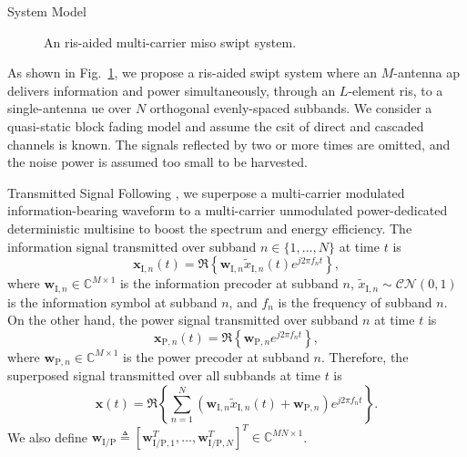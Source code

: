 \begin{section}{System Model}\label{se:system_model}
	\begin{figure}[!t]
		\centering
		\def\svgwidth{0.9\columnwidth}
		
		\caption{An \gls{ris}-aided multi-carrier \gls{miso} \gls{swipt} system.}
		\label{fi:system}
	\end{figure}

	As shown in Fig.~\ref{fi:system}, we propose a \gls{ris}-aided \gls{swipt} system where an $M$-antenna \gls{ap} delivers information and power simultaneously, through an $L$-element \gls{ris}, to a single-antenna \gls{ue} over $N$ orthogonal evenly-spaced subbands. We consider a quasi-static block fading model and assume the \gls{csit} of direct and cascaded channels is known. The signals reflected by two or more times are omitted, and the noise power is assumed too small to be harvested.


	\begin{subsection}{Transmitted Signal}
		Following \cite{Clerckx2018b}, we superpose a multi-carrier modulated information-bearing waveform to a multi-carrier unmodulated power-dedicated deterministic multisine to boost the spectrum and energy efficiency. The information signal transmitted over subband $n \in \{1, \dots, N\}$ at time $t$ is
		\begin{equation}
			\boldsymbol{x}_{\mathrm{I},n}(t) = \Re\left\{\boldsymbol{w}_{\mathrm{I},n} \tilde{x}_{\mathrm{I},n}(t) e^{j2{\pi}{f_n}{t}}\right\},
		\end{equation}
		where $\boldsymbol{w}_{\mathrm{I},n} \in \mathbb{C}^{M \times 1}$ is the information precoder at subband $n$, $\tilde{x}_{\mathrm{I},n}\sim\mathcal{CN}(0,1)$ is the information symbol at subband $n$, and $f_n$ is the frequency of subband $n$. On the other hand, the power signal transmitted over subband $n$ at time $t$ is
		\begin{equation}
			\boldsymbol{x}_{\mathrm{P},n}(t) = \Re\left\{\boldsymbol{w}_{\mathrm{P},n} e^{j2{\pi}{f_n}{t}}\right\},
		\end{equation}
		where $\boldsymbol{w}_{\mathrm{P},n} \in \mathbb{C}^{M \times 1}$ is the power precoder at subband $n$. Therefore, the superposed signal transmitted over all subbands at time $t$ is
		\begin{equation}
			\boldsymbol{x}(t) = \Re{\left\{\sum_{n=1}^N(\boldsymbol{w}_{\mathrm{I},n}\tilde{x}_{\mathrm{I},n}(t)+\boldsymbol{w}_{\mathrm{P},n}){e^{j2{\pi}{f_n}{t}}}\right\}}.
		\end{equation}
		We also define $\boldsymbol{w}_{\mathrm{I/P}} \triangleq [\boldsymbol{w}_{\mathrm{I/P},1}^T,\dots,\boldsymbol{w}_{\mathrm{I/P},N}^T]^T \in \mathbb{C}^{MN \times 1}$.
	\end{subsection}



\end{section}
